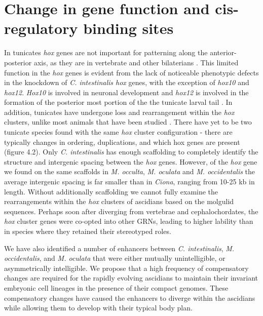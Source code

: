 \section{Change in gene function and cis-regulatory binding sites}
In tunicates \textit{hox} genes are not important for patterning along the anterior-posterior axis, as they are in vertebrate and other bilaterians \cite{finnerty_origins_2003,mallo_regulation_2013,ikuta_limited_2010}. This limited function in the \textit{hox} genes is evident from the lack of noticeable phenotypic defects in the knockdown of \textit{C. intestinalis hox} genes, with the exception of \textit{hox10} and \textit{hox12}. \textit{Hox10} is involved in neuronal development and \textit{hox12} is involved in the formation of the posterior most portion of the the tunicate larval tail \cite{ikuta_limited_2010}. In addition, tunicates have undergone loss and rearrangement within the \textit{hox} clusters, unlike most animals that have been studied \cite{ikuta_organization_2005}. There have yet to be two tunicate species found with the same \textit{hox} cluster configuration - there are typically changes in ordering, duplications, and which hox genes are present (figure 4.2). Only \textit{C. intestinalis} has enough scaffolding to completely identify the structure and intergenic spacing between the \textit{hox} genes. However, of the \textit{hox} gene we found on the same scaffolds in \textit{M. occulta}, \textit{M. oculata} and \textit{M. occidentalis} the average intergenic spacing is far smaller than in {\em Ciona}, ranging from 10-25 kb in length. Without additionally scaffolding we cannot fully examine the rearrangements within the \textit{hox} clusters of ascidians based on the molgulid sequences. Perhaps soon after diverging from vertebrae and cephalochordates, the \textit{hox} cluster genes were co-opted into other GRNs, leading to higher lability than in species where they retained their stereotyped roles.

We have also identified a number of enhancers between \textit{C. intestinalis}, \textit{M. occidentalis}, and \textit{M. oculata} that were either mutually unintelligible, or asymmetrically intelligible. We propose that a high frequency of compensatory changes are required for the rapidly evolving ascidians to maintain their invariant embryonic cell lineages in the presence of their compact genomes. These compensatory changes have caused the enhancers to diverge within the ascidians while allowing them to develop with their typical body plan.


